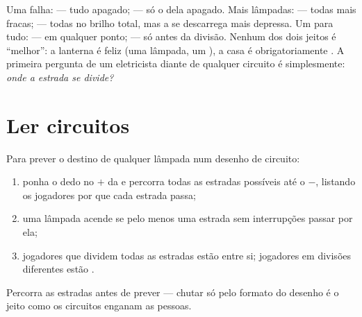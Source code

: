 \begin{remark}\label{rem:g5:series-parallel-circuits:compare}
Uma falha:  --- tudo apagado;  --- só o  dela
apagado. Mais lâmpadas:  --- todas mais fracas; 
--- todas no brilho total, mas a  se descarrega mais depressa.
Um  para tudo:  --- em qualquer ponto; 
--- só antes da divisão. Nenhum dos dois jeitos é ``melhor'': a
lanterna é feliz  (uma lâmpada, um ), a casa é
obrigatoriamente . A primeira pergunta de um eletricista
diante de qualquer circuito é simplesmente: \emph{onde a estrada se
divide?}
\end{remark}

\section{Ler circuitos}

\begin{method}\label{met:g5:series-parallel-circuits:follow}
Para prever o destino de qualquer lâmpada num desenho de circuito:
\begin{enumerate}
  \item ponha o dedo no $+$ da  e percorra todas as estradas
        possíveis até o $-$, listando os jogadores por que cada
        estrada passa;
  \item uma lâmpada acende se pelo menos uma estrada sem
        interrupções passar por ela;
  \item jogadores que dividem todas as estradas estão  entre
        si; jogadores em divisões diferentes estão .
\end{enumerate}
Percorra as estradas antes de prever --- chutar só pelo formato do
desenho é o jeito como os circuitos enganam as pessoas.
\end{method}

